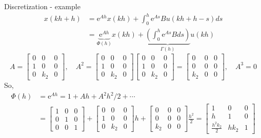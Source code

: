 \documentclass[presentation,aspectratio=1610]{beamer}
\begin{document}
\begin{frame}[label={sec:org8b97ae2}]{Discretization - example}
 \begin{align*}
  x(kh+h) &= \mathrm{e}^{Ah} x(kh) + \int_{0}^{h} \mathrm{e}^{As} B u(kh+h-s) ds\\
   &= \underbrace{\mathrm{e}^{Ah}}_{\Phi(h)} x(kh) + \underbrace{\left(\int_{0}^h \mathrm{e}^{As} B ds \right)}_{\Gamma(h)} u(kh)
\end{align*}
\[ A = \begin{bmatrix} 0 & 0 & 0\\1 & 0 & 0\\0 & k_2 & 0\end{bmatrix}, \quad A^2 = \begin{bmatrix} 0 & 0 & 0\\1 & 0 & 0\\0 & k_2 & 0\end{bmatrix}\begin{bmatrix} 0 & 0 & 0\\1 & 0 & 0\\0 & k_2 & 0\end{bmatrix}= \begin{bmatrix} 0 & 0 & 0\\0 & 0 & 0\\k_2 & 0  & 0\end{bmatrix}, \quad A^3 = 0\]
So,
\begin{align*}
 \Phi(h) &= \mathrm{e}^{Ah} = 1 + Ah + A^2 h^2/2  + \cdots \\
 &= \begin{bmatrix} 1 & 0 & 0\\0 & 1 & 0\\0 & 0 & 1\end{bmatrix} + \begin{bmatrix} 0 & 0 & 0\\1 & 0 & 0\\0 & k_2 & 0\end{bmatrix}h + \begin{bmatrix} 0 & 0 & 0\\0 & 0 & 0\\k_2 & 0 & 0\end{bmatrix}\frac{h^ 2}{2}= \begin{bmatrix} 1 & 0 & 0\\h & 1 & 0\\\frac{h^2k_2}{2} & hk_2 & 1\end{bmatrix}
 \end{align*}
\end{frame}
\end{document}
